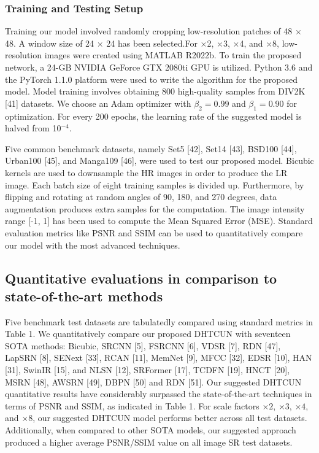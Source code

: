 \documentclass{ieeeaccess}
\begin{document}
\subsubsection{Training and Testing Setup} 

Training our model involved randomly cropping low-resolution patches of 48 $\times$ 48. A window size of 24 $\times$ 24 has been selected.For $\times$2, $\times$3, $\times$4, and $\times$8, low-resolution images were created using MATLAB R2022b. To train the proposed network, a 24-GB NVIDIA GeForce GTX 2080ti GPU is utilized. Python 3.6 and the PyTorch 1.1.0 platform were used to write the algorithm for the proposed model. Model training involves obtaining  800 high-quality samples from DIV2K [41] datasets. We choose an Adam optimizer with $\beta_2 = 0.99$ and $\beta_1 = 0.90$ for optimization. For every 200 epochs, the learning rate of the suggested model is halved from 10$^{-4}$. 

Five common benchmark datasets, namely Set5 [42], Set14 [43], BSD100 [44], Urban100 [45], and Manga109 [46], were used to test our proposed model. Bicubic kernels are used to downsample the HR images in order to produce the LR image. Each batch size of eight training samples is divided up. Furthermore, by flipping and rotating at random angles of 90, 180, and 270 degrees, data augmentation produces extra samples for the computation. The image intensity range [-1, 1] has been used to compute the Mean Squared Error (MSE). Standard evaluation metrics like PSNR and SSIM can be used to quantitatively compare our model with the most advanced techniques.

\subsection{Quantitative evaluations in comparison to state-of-the-art methods}
Five benchmark test datasets are tabulatedly compared using standard metrics in Table 1. We quantitatively compare our proposed DHTCUN with seventeen SOTA methods: Bicubic, SRCNN [5], FSRCNN [6], VDSR [7], RDN [47], LapSRN [8], SENext [33], RCAN [11], MemNet [9], MFCC [32], EDSR [10], HAN [31], SwinIR [15], and NLSN [12], SRFormer [17], TCDFN [19], HNCT [20], MSRN [48], AWSRN [49], DBPN [50] and RDN [51]. 
Our suggested DHTCUN quantitative results have considerably surpassed the state-of-the-art techniques in terms of PSNR and SSIM, as indicated in Table 1. For scale factors $\times2$, $\times3$, $\times4$, and $\times8$, our suggested DHTCUN model performs better across all test datasets. Additionally, when compared to other SOTA models, our suggested approach produced a higher average PSNR/SSIM value on all image SR test datasets.
\end{document}
